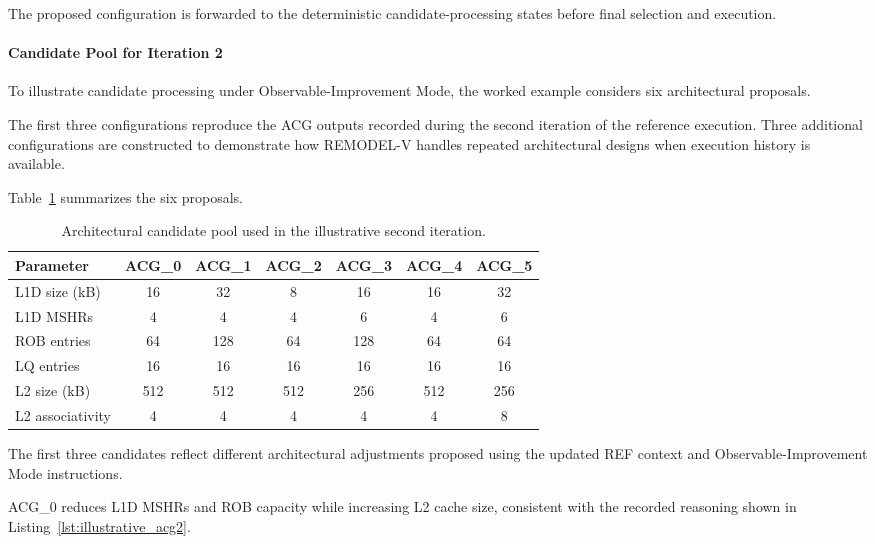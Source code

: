 The proposed configuration is forwarded
to the deterministic candidate-processing
states before final selection and execution.



\paragraph{Candidate Pool for Iteration 2}
\label{app:illustrative_acg2_pool}

To illustrate candidate processing under
Observable-Improvement Mode, the worked example
considers six architectural proposals.

The first three configurations reproduce the
ACG outputs recorded during the second iteration
of the reference execution. Three additional
configurations are constructed to demonstrate
how REMODEL-V handles repeated architectural
designs when execution history is available.

Table~\ref{tab:illustrative_acg2_pool}
summarizes the six proposals.

\begin{table}[htbp]
\centering
\caption{Architectural candidate pool used in
the illustrative second iteration.}
\label{tab:illustrative_acg2_pool}
\scriptsize
\setlength{\tabcolsep}{3pt}
\renewcommand{\arraystretch}{1.1}
\begin{tabular}{lcccccc}
\hline
\textbf{Parameter} &
\textbf{ACG\_0} &
\textbf{ACG\_1} &
\textbf{ACG\_2} &
\textbf{ACG\_3} &
\textbf{ACG\_4} &
\textbf{ACG\_5} \\
\hline
L1D size (kB) & 16 & 32 & 8 & 16 & 16 & 32 \\
L1D MSHRs & 4 & 4 & 4 & 6 & 4 & 6 \\
ROB entries & 64 & 128 & 64 & 128 & 64 & 64 \\
LQ entries & 16 & 16 & 16 & 16 & 16 & 16 \\
L2 size (kB) & 512 & 512 & 512 & 256 & 512 & 256 \\
L2 associativity & 4 & 4 & 4 & 4 & 4 & 8 \\
\hline
\end{tabular}
\end{table}

The first three candidates reflect different
architectural adjustments proposed using the
updated REF context and Observable-Improvement
Mode instructions.

ACG\_0 reduces L1D MSHRs and ROB capacity
while increasing L2 cache size, consistent
with the recorded reasoning shown in
Listing~\ref{lst:illustrative_acg2}.

